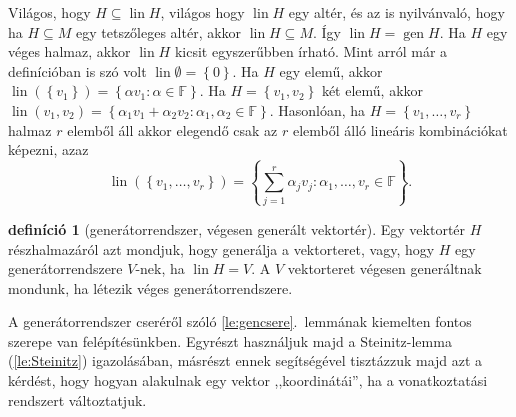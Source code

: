 \documentclass[9pt, showtrims]{memoir}
\makeatletter
\renewenvironment{proof}[1][\proofname]
    {\par\pushQED{\qed}%
    \normalfont \topsep6\p@\@plus6\p@\relax
    \trivlist
    \item[\hskip\labelsep
        \itshape
    #1\@addpunct{:}]\ignorespaces}
    {\popQED\endtrivlist\@endpefalse}
\theoremstyle{plain}
\theoremstyle{remark}
\theoremstyle{definition}
\newtheorem{definition}[proposition]{definíció}
\renewcommand{\mathbf}{\mathbb}
\DeclareMathOperator{\lin}{lin}
\DeclareMathOperator{\gen}{gen}
\makeatother
\begin{document}
\begin{proof}
    Világos, hogy $H\subseteq \lin H$, világos hogy $\lin H$ egy altér, 
    és az is nyilvánvaló, hogy ha $H\subseteq M$ egy tetszőleges altér, 
    akkor $\lin H\subseteq M$.
    Így $\lin H=\gen H$.
\end{proof}
Ha $H$ egy véges halmaz, akkor $\lin H$ kicsit egyszerűbben írható.
Mint arról már a definícióban is szó volt $\lin \emptyset=\left\{ 0 \right\}$.
Ha $H$ egy elemű, akkor $\lin (\left\{ v_1 \right\})=\left\{ \alpha v_1:\alpha\in\mathbf{F} \right\}$.
Ha $H=\left\{ v_1,v_2 \right\}$ két elemű, akkor
$\lin({v_1,v_2})=\left\{ \alpha_1v_1+\alpha_2v_2:\alpha_1,\alpha_2\in\mathbf{F} \right\}$.
Hasonlóan, ha $H=\left\{ v_1,\dots,v_r \right\}$ halmaz $r$ elemből áll akkor elegendő csak az $r$ elemből álló lineáris kombinációkat képezni, azaz
\[
    \lin \left( \left\{ v_1,\dots,v_r \right\} \right)
    =
    \left\{ \sum_{j=1}^r\alpha_jv_j:\alpha_1,\dots,v_r\in\mathbf{F} \right\}.
\]
\begin{definition}[generátorrendszer, végesen generált vektortér]
    Egy vektortér $H$ részhalmazáról azt mondjuk, hogy generálja a vektorteret,
    vagy, hogy $H$ egy generátorrendszere $V$-nek, ha $\lin H=V$.
    A $V$ vektorteret végesen generáltnak mondunk, ha létezik véges generátorrendszere.
\end{definition}

A generátorrendszer cseréről szóló \ref{le:gencsere}.~lemmának kiemelten fontos szerepe van felépítésünkben.
Egyrészt használjuk majd a Steinitz-lemma (\ref{le:Steinitz}) igazolásában, 
másrészt ennek segítségével tisztázzuk majd azt a kérdést,
hogy hogyan alakulnak egy vektor ,,koordinátái'', ha a vonatkoztatási rendszert változtatjuk.
\end{document}
